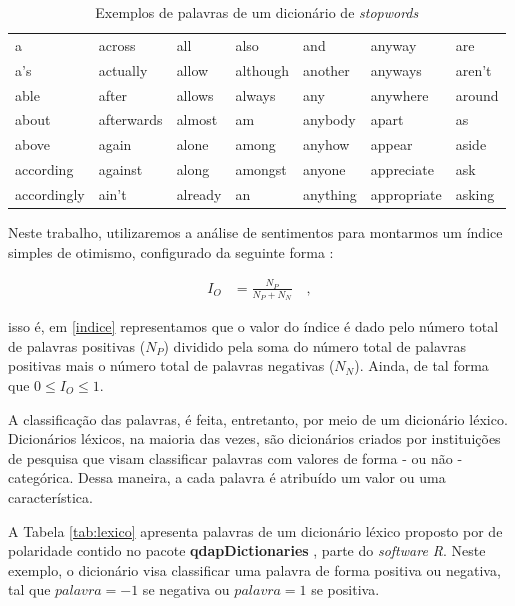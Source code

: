 \begin{table}[!h]
\centering
\caption{Exemplos de palavras de um dicionário de \textit{stopwords}}
\begin{tabular}{lllllll}
  \hline
 a & across & all & also & and & anyway & are \\ 
 a's & actually & allow & although & another & anyways & aren't \\ 
 able & after & allows & always & any & anywhere & around \\ 
 about & afterwards & almost & am & anybody & apart & as \\ 
 above & again & alone & among & anyhow & appear & aside \\ 
 according & against & along & amongst & anyone & appreciate & ask \\ 
 accordingly & ain't & already & an & anything & appropriate & asking \\ 
   \hline
\end{tabular}
\label{tab:stopwords}
\end{table}

Neste trabalho, utilizaremos a análise de sentimentos para montarmos um índice simples de otimismo, configurado da seguinte forma \cite{costa2016ensaios}:

\begin{align} \label{indice} 
    I_O &= \frac{N_P}{N_P + N_N} \quad ,
\end{align}

\noindent
isso é, em \ref{indice} representamos que o valor do índice é dado pelo número total de palavras positivas ($N_P$) dividido pela soma do número total de palavras positivas mais o número total de palavras negativas ($N_N$). Ainda, de tal forma que $0 \leq I_O \leq 1$.  

A classificação das palavras, é feita, entretanto, por meio de um dicionário léxico. Dicionários léxicos, na maioria das vezes, são dicionários criados por instituições de pesquisa que visam classificar palavras com valores de forma - ou não - categórica. Dessa maneira, a cada palavra é atribuído um valor ou uma característica. 

A Tabela \ref{tab:lexico} apresenta palavras de um dicionário léxico proposto por  de polaridade contido no pacote \textbf{qdapDictionaries} \cite{qdapdict}, parte do \textit{software R}. Neste exemplo, o dicionário visa classificar uma palavra de forma positiva ou negativa, tal que $palavra = -1$ se negativa ou $palavra = 1$ se positiva.

